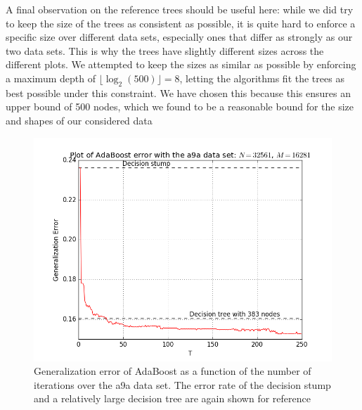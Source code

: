 \par A final observation on the reference trees should be useful here: while we did try to keep the size of the trees as consistent as possible, it is quite hard to enforce a specific size over different data sets, especially ones that differ as strongly as our two data sets. This is why the  trees have slightly different sizes across the different plots. We attempted to keep the sizes as similar as possible by enforcing a maximum depth of $\lfloor \log_2(500)\rfloor=8$, letting the algorithms fit the trees as best possible under this constraint. We have chosen this because this ensures an upper bound of 500 nodes, which we found to be a reasonable bound for the size and shapes of our considered data
\begin{figure}[!ht]
  \centering
      \includegraphics[width=\graphWidth]{generated/ADSVM.png}
  \caption{Generalization error of AdaBoost as a function of the number of iterations over the a9a data set. The error rate of the decision stump and a relatively large decision tree are again shown for reference}
      \label{fig:adaBSVM}
\end{figure}
\FloatBarrier

